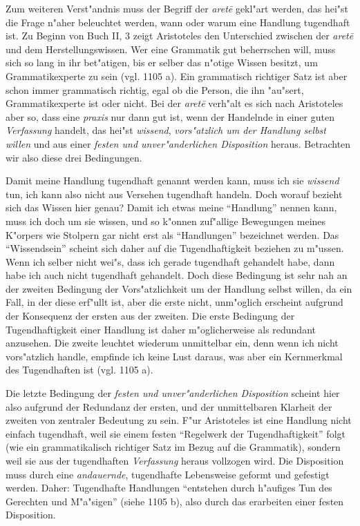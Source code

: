 \documentclass[a4paper, emulatestandardclasses, 12pt]{scrartcl}
\begin{document}
\begin{onehalfspace}
\noindent Zum weiteren Verst"andnis muss der Begriff der \emph{aret\={e}} gekl"art werden, das hei"st die Frage n"aher beleuchtet werden, wann oder warum eine Handlung tugendhaft ist. Zu Beginn von Buch II, 3 zeigt Aristoteles den Unterschied zwischen der \emph{aret\={e}} und dem  Herstellungswissen. Wer eine Grammatik gut beherrschen will, muss sich so lang in ihr bet"atigen, bis er selber das n"otige Wissen besitzt, um Grammatikexperte zu sein (vgl. 1105 a). Ein grammatisch richtiger Satz ist aber schon immer grammatisch richtig, egal ob die Person, die ihn "au"sert, Grammatikexperte ist oder nicht. Bei der \emph{aret\={e}} verh"alt es sich nach Aristoteles aber so, dass eine \emph{praxis} nur dann gut ist, wenn der Handelnde in einer guten \emph{Verfassung} handelt, das hei"st \emph{wissend}, \emph{vors"atzlich um der Handlung selbst willen} und aus einer \emph{festen und unver"anderlichen Disposition} heraus. Betrachten wir also diese drei Bedingungen.

Damit meine Handlung tugendhaft genannt werden kann, muss ich sie \emph{wissend} tun, ich kann also nicht aus Versehen tugendhaft handeln. Doch worauf bezieht sich das Wissen hier genau? Damit ich etwas meine "`Handlung"' nennen kann, muss ich doch um sie wissen, und so k"onnen zuf"allige Bewegungen meines K"orpers wie Stolpern gar nicht erst als "`Handlungen"' bezeichnet werden. Das "`Wissendsein"' scheint sich daher auf die Tugendhaftigkeit beziehen zu m"ussen. Wenn ich selber nicht wei"s, dass ich gerade tugendhaft gehandelt habe, dann habe ich auch nicht tugendhaft gehandelt. Doch diese Bedingung ist sehr nah an der zweiten Bedingung der Vors"atzlichkeit um der Handlung selbst willen, da ein Fall, in der diese erf"ullt ist, aber die erste nicht, unm"oglich erscheint aufgrund der Konsequenz der ersten aus der zweiten. Die erste Bedingung der Tugendhaftigkeit einer Handlung ist daher m"oglicherweise als redundant anzusehen. Die zweite leuchtet wiederum unmittelbar ein, denn wenn ich nicht vors"atzlich handle, empfinde ich keine Lust daraus, was aber ein Kernmerkmal des Tugendhaften ist (vgl. 1105 a). 

Die letzte Bedingung der \emph{festen und unver"anderlichen Disposition} scheint hier also aufgrund der Redundanz der ersten, und der unmittelbaren Klarheit der zweiten von zentraler Bedeutung zu sein. F"ur Aristoteles ist eine Handlung nicht einfach tugendhaft, weil sie einem festen "`Regelwerk der Tugendhaftigkeit"' folgt (wie ein grammatikalisch richtiger Satz im Bezug auf die Grammatik), sondern weil sie aus der tugendhaften \emph{Verfassung} heraus vollzogen wird. Die Disposition muss durch eine \emph{andauernde}, tugendhafte Lebensweise geformt und gefestigt werden. Daher: Tugendhafte Handlungen "`entstehen durch h"aufiges Tun des Gerechten und M"a"sigen"' (siehe 1105 b), also durch das erarbeiten einer festen Disposition.


\end{onehalfspace}
\end{document}
